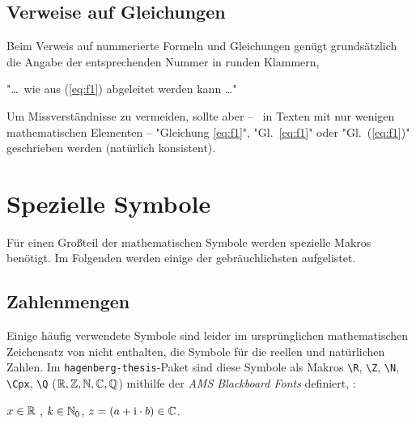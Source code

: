 \subsection{Verweise auf Gleichungen}
\label{sec:VerweiseAufGleichungen}

Beim Verweis auf nummerierte Formeln und Gleichungen genügt grundsätzlich die Angabe 
der entsprechenden Nummer in runden Klammern,
\zB\
\begin{center}
"\ldots\ wie aus (\ref{eq:f1}) abgeleitet werden kann \ldots"
\end{center}
Um Missverständnisse zu vermeiden, sollte aber -- \va\ in Texten mit
nur wenigen mathematischen Elementen -- "Gleichung \ref{eq:f1}", "Gl.~\ref{eq:f1}" 
oder "Gl.~(\ref{eq:f1})" geschrieben werden (natürlich konsistent). 

\begin{center}
\setlength{\fboxrule}{0.2mm}
\setlength{\fboxsep}{2mm}
\end{center}


\section{Spezielle Symbole}

Für einen Großteil der mathematischen Symbole werden spezielle Makros benötigt. Im Folgenden werden einige der gebräuchlichsten aufgelistet.

\subsection{Zahlenmengen}
Einige häufig verwendete Symbole sind leider im ursprünglichen
mathematischen Zeichensatz von \latex nicht enthalten, \zB die
Symbole für die reellen und natürlichen Zahlen. Im \texttt{hagenberg-thesis}-Paket sind diese Symbole als Makros 
\verb!\R!, \verb!\Z!, \verb!\N!, \verb!\Cpx!, \verb!\Q!
($\R, \Z, \N, \Cpx, \Q$)
mithilfe der \emph{AMS Blackboard Fonts} definiert, \zB:
\begin{center}
$x \in \R$ , $k \in \N_0$, $z = (a + \mathrm{i} \cdot b) \in \Cpx$.
\end{center}


